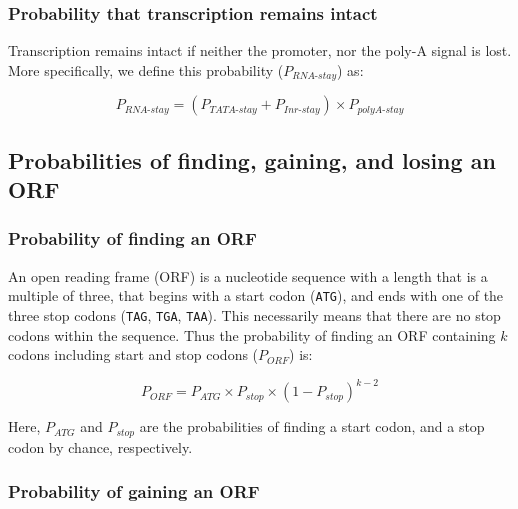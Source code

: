 \documentclass[12pt,a4paper]{article}
\begin{document}
\subsubsection{Probability that transcription remains intact}

Transcription remains intact if neither the promoter, nor the poly-A signal is lost. More specifically, we define this probability ($P_\textit{RNA-stay}$) as:

\begin{equation}
P_\textit{RNA-stay} = (P_\textit{TATA-stay} + P_\textit{Inr-stay}) \times P_\textit{polyA-stay}
\label{eqrnastay}
\end{equation}

\subsection{Probabilities of finding, gaining, and losing an ORF}

\subsubsection{Probability of finding an ORF}

An open reading frame (ORF) is a nucleotide sequence with a length that is a multiple of three, that begins with a start codon (\texttt{ATG}), and ends with one of the three stop codons (\texttt{TAG}, \texttt{TGA}, \texttt{TAA}). This necessarily means that there are no stop codons within the sequence. Thus the probability of finding an ORF containing $k$ codons including start and stop codons ($P_\textit{ORF}$) is: 

\begin{equation}
P_\textit{ORF} = P_\textit{ATG} \times P_\textit{stop} \times (1 - P_\textit{stop})^{k-2}
\label{eqorfprob}
\end{equation}

Here, $P_\textit{ATG}$ and $P_\textit{stop}$ are the probabilities of finding a start codon, and a stop codon by chance, respectively.

\subsubsection{Probability of gaining an ORF}
\end{document}
